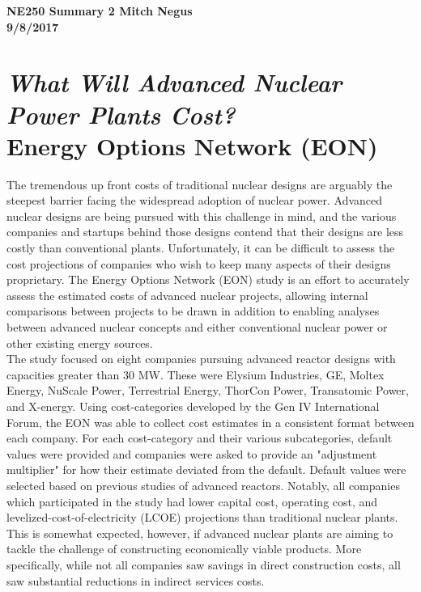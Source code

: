 \documentclass{report}
\newcommand{\tab}{\-\hspace{1cm}}
\begin{document}
\thispagestyle{empty}

{\bf {\large {NE250 Summary {2} \hfill Mitch Negus\\
		\hspace*{\fill} 9/8/2017\\ }}}
\section*{\textsl{What Will Advanced Nuclear Power Plants Cost?} \\ \normalsize Energy Options Network (EON)}

\tab The tremendous up front costs of traditional nuclear designs are arguably the steepest barrier facing the widespread adoption of nuclear power. Advanced nuclear designs are being pursued with this challenge in mind, and the various companies and startups behind those designs contend that their designs are less costly than conventional plants. Unfortunately, it can be difficult to assess the cost projections of companies who wish to keep many aspects of their designs proprietary. The Energy Options Network (EON) study is an effort to accurately assess the estimated costs of advanced nuclear projects, allowing internal comparisons between projects to be drawn in addition to enabling analyses between advanced nuclear concepts and either conventional nuclear power or other existing energy sources.\\
\tab The study focused on eight companies pursuing advanced reactor designs with capacities greater than 30 MW. These were Elysium Industries, GE, Moltex Energy, NuScale Power, Terrestrial Energy, ThorCon Power, Transatomic Power, and X-energy. Using cost-categories developed by the Gen IV International Forum, the EON was able to collect cost estimates in a consistent format between each company. For each cost-category and their various subcategories, default values were provided and companies were asked to provide an "adjustment multiplier" for how their estimate deviated from the default. Default values were selected based on previous studies of advanced reactors. Notably, all companies which participated in the study had lower capital cost, operating cost, and levelized-cost-of-electricity (LCOE) projections than traditional nuclear plants. This is somewhat expected, however, if advanced nuclear plants are aiming to tackle the challenge of constructing economically viable products. More specifically, while not all companies saw savings in direct construction costs, all saw substantial reductions in indirect services costs.\\
\end{document}
